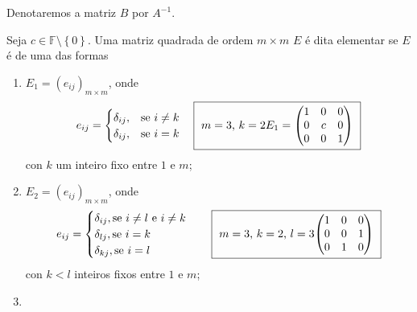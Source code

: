 Denotaremos a matriz $B$ por $A^{-1}$.

\begin{definition}
  Seja $c\in\mathbb{F}\setminus\left\{0\right\}$.
  Uma matriz quadrada de ordem $m\times m$ $E$ é dita elementar se
  $E$ é de uma das formas
  \begin{enumerate}
    \item

          $E_{1}={\left(e_{ij}\right)}_{m\times m}$, onde
          \[
            e_{ij}=
            \begin{cases}
              \delta_{ij}, & \text{se }i\neq k \\
              \delta_{ij}, & \text{se }i=k
            \end{cases}\quad
            \fbox{
              $m=3$, $k=2$\\
              $E_{1}=
                \begin{pmatrix}
                  1 & 0 & 0 \\
                  0 & c & 0 \\
                  0 & 0 & 1
                \end{pmatrix}$
            }
          \]
          con $k$ um inteiro fixo entre $1$ e $m$;
    \item

          $E_{2}={\left(e_{ij}\right)}_{m\times m}$, onde
          \[
            e_{ij}=
            \begin{cases}
              \delta_{ij},\text{se }i\neq l\text{ e }i\neq k \\
              \delta_{lj},\text{se }i=k                      \\
              \delta_{kj},\text{se }i=l
            \end{cases}\quad
            \fbox{
              $m=3$, $k=2$, $l=3$ \\
              \begin{math}
                \begin{pmatrix}
                  1 & 0 & 0 \\
                  0 & 0 & 1 \\
                  0 & 1 & 0
                \end{pmatrix}
              \end{math}
            }
          \]
          con $k<l$ inteiros fixos entre $1$ e $m$;
    \item


\end{enumerate}
\end{definition}
